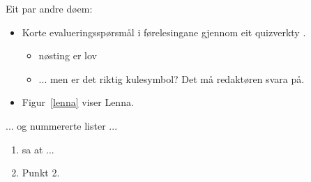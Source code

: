 \documentclass[nynorsk]{mnt}
\begin{document}
Eit par andre døem:
\begin{itemize}
  \item 
Korte evalueringsspørsmål i førelesingane gjennom eit
      quizverkty \citep{hgs2018udit}.
   \begin{itemize}
     \item nøsting er lov
     \item ... men er det riktig kulesymbol?  Det må redaktøren svara på.
   \end{itemize}
  \item 
Figur~\ref{lenna} viser Lenna.
\end{itemize}

... og nummererte lister ...
\begin{enumerate}
  \item 
    \cite{biggs11a} sa at ...
  \item Punkt 2.
\end{enumerate}




\end{document}
